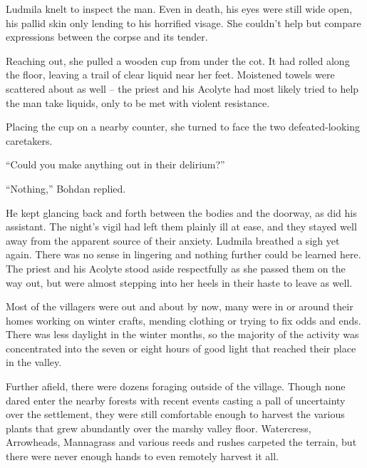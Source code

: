  

Ludmila knelt to inspect the man. Even in death, his eyes were still wide open, his pallid skin only lending to his horrified visage. She couldn’t help but compare expressions between the corpse and its tender.

 

Reaching out, she pulled a wooden cup from under the cot. It had rolled along the floor, leaving a trail of clear liquid near her feet. Moistened towels were scattered about as well – the priest and his Acolyte had most likely tried to help the man take liquids, only to be met with violent resistance.

 

Placing the cup on a nearby counter, she turned to face the two defeated-looking caretakers.

 

“Could you make anything out in their delirium?”

 

“Nothing,” Bohdan replied.

 

He kept glancing back and forth between the bodies and the doorway, as did his assistant. The night’s vigil had left them plainly ill at ease, and they stayed well away from the apparent source of their anxiety. Ludmila breathed a sigh yet again. There was no sense in lingering and nothing further could be learned here. The priest and his Acolyte stood aside respectfully as she passed them on the way out, but were almost stepping into her heels in their haste to leave as well.

 

Most of the villagers were out and about by now, many were in or around their homes working on winter crafts, mending clothing or trying to fix odds and ends. There was less daylight in the winter months, so the majority of the activity was concentrated into the seven or eight hours of good light that reached their place in the valley.

 

Further afield, there were dozens foraging outside of the village. Though none dared enter the nearby forests with recent events casting a pall of uncertainty over the settlement, they were still comfortable enough to harvest the various plants that grew abundantly over the marshy valley floor. Watercress, Arrowheads, Mannagrass and various reeds and rushes carpeted the terrain, but there were never enough hands to even remotely harvest it all.

